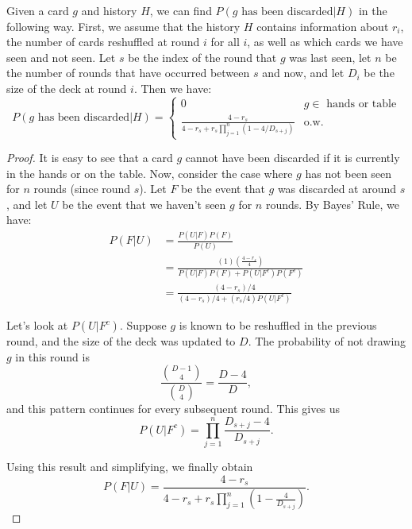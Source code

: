 \documentclass[11pt]{article}
\begin{document}
Given a card $g$ and history $H$, we can find $P(g \text{ has been discarded}|H)$ in the following way. First, we assume that the history $H$ contains information about $r_i$, the number of cards reshuffled at round $i$ for all $i$, as well as which cards we have seen and not seen. Let $s$ be the index of the round that $g$ was last seen, let $n$ be the number of rounds that have occurred between $s$ and now, and let $D_i$ be the size of the deck at round $i$. Then we have:
\begin{equation}
P(g \text{ has been discarded}|H) = \begin{cases}
  0 & g \in \text{ hands or table} \\
  \frac{4-r_s}{4-r_s+r_s\prod_{j=1}^n(1-4/{D_{s+j}})} & \text{o.w.}
\end{cases}
\label{eq:p-discarded} \end{equation}

\begin{proof}
  It is easy to see that a card $g$ cannot have been discarded if it is currently in the hands or on the table. Now, consider the case where $g$ has not been seen for $n$ rounds (since round $s$). Let $F$ be the event that $g$ was discarded at around $s$, and let $U$ be the event that we haven't seen $g$ for $n$ rounds. By Bayes' Rule, we have:
\begin{align}
  P(F|U) &= \frac{P(U|F)P(F)}{P(U)} \\
  &= \frac{(1)\left(\frac{4-r_s}{4}\right)}{P(U|F)P(F) + P(U|F^c)P(F^c)} \\
  &= \frac{(4-r_s)/4}{(4-r_s)/4 + (r_s/4)P(U|F^c)}
\end{align}

Let's look at $P(U|F^c)$. Suppose $g$ is known to be reshuffled in the previous round, and the size of the deck was updated to $D$. The probability of not drawing $g$ in this round is
\begin{equation}
  \frac{{D-1 \choose 4}}{{D \choose 4}} = \frac{D-4}{D},
\end{equation} and this pattern continues for every subsequent round. This gives us
\begin{equation}
  P(U|F^c) = \prod_{j=1}^n \frac{D_{s+j} - 4}{D_{s+j}}.
\end{equation}

Using this result and simplifying, we finally obtain
\begin{equation}
  P(F|U) = \frac{4-r_s}{4-r_s+r_s\prod_{j=1}^n(1-\frac{4}{{D_{s+j}}})}.
\end{equation}
\end{proof}
\end{document}
